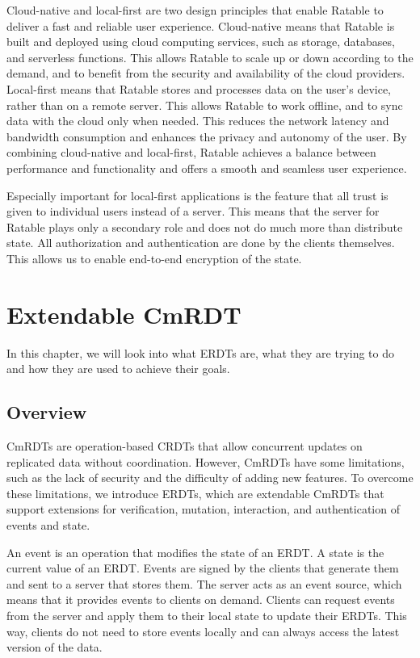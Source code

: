 \documentclass[
	ngerman,
	ruledheaders=section,   %
	class=report,		    %
	thesis={type=bachelor}, %
	accentcolor=9c,			%
	custommargins=true,    %
	marginpar=false,        %
	parskip=half-,          %
	fontsize=11pt,          %
]{tudapub}
\begin{document}
Cloud-native and local-first are two design principles that enable Ratable to deliver a fast and reliable user experience. Cloud-native means that Ratable is built and deployed using cloud computing services, such as storage, databases, and serverless functions. This allows Ratable to scale up or down according to the demand, and to benefit from the security and availability of the cloud providers. Local-first means that Ratable stores and processes data on the user’s device, rather than on a remote server. This allows Ratable to work offline, and to sync data with the cloud only when needed. This reduces the network latency and bandwidth consumption and enhances the privacy and autonomy of the user. By combining cloud-native and local-first, Ratable achieves a balance between performance and functionality and offers a smooth and seamless user experience.

Especially important for local-first applications is the feature that all trust is given to individual users instead of a server. This means that the server for Ratable plays only a secondary role and does not do much more than distribute state. All authorization and authentication are done by the clients themselves. This allows us to enable end-to-end encryption of the state.

\chapter{Extendable CmRDT}
In this chapter, we will look into what ERDTs are, what they are trying to do and how they are used to achieve their goals.

\section{Overview}
CmRDTs are operation-based CRDTs that allow concurrent updates on replicated data without coordination. However, CmRDTs have some limitations, such as the lack of security and the difficulty of adding new features. To overcome these limitations, we introduce ERDTs, which are extendable CmRDTs that support extensions for verification, mutation, interaction, and authentication of events and state.

An event is an operation that modifies the state of an ERDT. A state is the current value of an ERDT. Events are signed by the clients that generate them and sent to a server that stores them. The server acts as an event source, which means that it provides events to clients on demand. Clients can request events from the server and apply them to their local state to update their ERDTs. This way, clients do not need to store events locally and can always access the latest version of the data.
\end{document}
